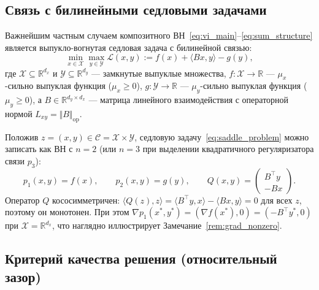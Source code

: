 \documentclass[11pt, a4paper]{article}
\theoremstyle{definition}
\begin{document}
\subsection{Связь с билинейными седловыми задачами}

Важнейшим частным случаем композитного ВН~\eqref{eq:vi_main}--\eqref{eq:sum_structure} является выпукло-вогнутая седловая задача с билинейной связью:
\begin{equation}\label{eq:saddle_problem}
\min_{x \in \mathcal{X}} \max_{y \in \mathcal{Y}} \mathcal{L}(x, y) := f(x) + \langle B x, y \rangle - g(y),
\end{equation}
где $\mathcal{X} \subseteq \mathbb{R}^{d_x}$ и $\mathcal{Y} \subseteq \mathbb{R}^{d_y}$ --- замкнутые выпуклые множества, $f : \mathcal{X} \to \mathbb{R}$ --- $\mu_x$-сильно выпуклая функция ($\mu_x \ge 0$), $g : \mathcal{Y} \to \mathbb{R}$ --- $\mu_y$-сильно выпуклая функция ($\mu_y \ge 0$), а $B \in \mathbb{R}^{d_y \times d_x}$ --- матрица линейного взаимодействия с операторной нормой $L_{xy} = \Vert B \Vert_{\mathrm{op}}$.

Положив $z = (x, y) \in \mathcal{C} = \mathcal{X} \times \mathcal{Y}$, седловую задачу~\eqref{eq:saddle_problem} можно записать как ВН с $n = 2$ (или $n = 3$ при выделении квадратичного регуляризатора связи $p_3$):
\begin{equation}\label{eq:saddle_as_vi}
p_1(x, y) = f(x), \qquad p_2(x, y) = g(y), \qquad Q(x, y) = \begin{pmatrix} B^\top y \\ -B x \end{pmatrix}.
\end{equation}
Оператор $Q$ кососимметричен: $\langle Q(z), z \rangle = \langle B^\top y, x \rangle - \langle B x, y \rangle = 0$ для всех $z$, поэтому он монотонен. При этом $\nabla p_1(x^*, y^*) = (\nabla f(x^*), 0) = (-B^\top y^*, 0)$ при $\mathcal{X} = \mathbb{R}^{d_x}$, что наглядно иллюстрирует Замечание~\ref{rem:grad_nonzero}.

\subsection{Критерий качества решения (относительный зазор)}
\end{document}
